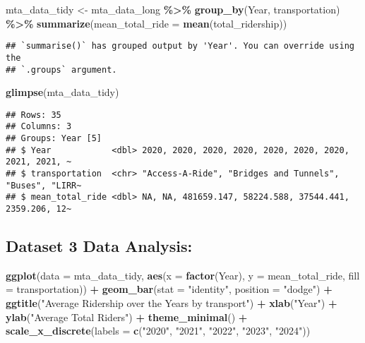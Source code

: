 \documentclass[
]{article}
\newenvironment{Shaded}{\begin{snugshade}}{\end{snugshade}}
\newcommand{\AttributeTok}[1]{\textcolor[rgb]{0.13,0.29,0.53}{#1}}
\newcommand{\FunctionTok}[1]{\textcolor[rgb]{0.13,0.29,0.53}{\textbf{#1}}}
\newcommand{\NormalTok}[1]{#1}
\newcommand{\OtherTok}[1]{\textcolor[rgb]{0.56,0.35,0.01}{#1}}
\newcommand{\SpecialCharTok}[1]{\textcolor[rgb]{0.81,0.36,0.00}{\textbf{#1}}}
\newcommand{\StringTok}[1]{\textcolor[rgb]{0.31,0.60,0.02}{#1}}
\begin{document}
\begin{Shaded}
\begin{Highlighting}[]
\NormalTok{mta\_data\_tidy }\OtherTok{\textless{}{-}}\NormalTok{ mta\_data\_long }\SpecialCharTok{\%\textgreater{}\%}
  \FunctionTok{group\_by}\NormalTok{(Year, transportation) }\SpecialCharTok{\%\textgreater{}\%}
  \FunctionTok{summarize}\NormalTok{(}\AttributeTok{mean\_total\_ride =} \FunctionTok{mean}\NormalTok{(total\_ridership))}
\end{Highlighting}
\end{Shaded}

\begin{verbatim}
## `summarise()` has grouped output by 'Year'. You can override using the
## `.groups` argument.
\end{verbatim}

\begin{Shaded}
\begin{Highlighting}[]
\FunctionTok{glimpse}\NormalTok{(mta\_data\_tidy)}
\end{Highlighting}
\end{Shaded}

\begin{verbatim}
## Rows: 35
## Columns: 3
## Groups: Year [5]
## $ Year            <dbl> 2020, 2020, 2020, 2020, 2020, 2020, 2020, 2021, 2021, ~
## $ transportation  <chr> "Access-A-Ride", "Bridges and Tunnels", "Buses", "LIRR~
## $ mean_total_ride <dbl> NA, NA, 481659.147, 58224.588, 37544.441, 2359.206, 12~
\end{verbatim}

\subsection{Dataset 3 Data Analysis:}\label{dataset-3-data-analysis}

\begin{Shaded}
\begin{Highlighting}[]
\FunctionTok{ggplot}\NormalTok{(}\AttributeTok{data =}\NormalTok{ mta\_data\_tidy, }\FunctionTok{aes}\NormalTok{(}\AttributeTok{x =} \FunctionTok{factor}\NormalTok{(Year), }\AttributeTok{y =}\NormalTok{ mean\_total\_ride, }\AttributeTok{fill =}\NormalTok{ transportation)) }\SpecialCharTok{+}
  \FunctionTok{geom\_bar}\NormalTok{(}\AttributeTok{stat =} \StringTok{"identity"}\NormalTok{, }\AttributeTok{position =} \StringTok{"dodge"}\NormalTok{) }\SpecialCharTok{+}
  \FunctionTok{ggtitle}\NormalTok{(}\StringTok{"Average Ridership over the Years by transport"}\NormalTok{) }\SpecialCharTok{+}
  \FunctionTok{xlab}\NormalTok{(}\StringTok{"Year"}\NormalTok{) }\SpecialCharTok{+}
  \FunctionTok{ylab}\NormalTok{(}\StringTok{"Average Total Riders"}\NormalTok{) }\SpecialCharTok{+}
  \FunctionTok{theme\_minimal}\NormalTok{() }\SpecialCharTok{+}
  \FunctionTok{scale\_x\_discrete}\NormalTok{(}\AttributeTok{labels =} \FunctionTok{c}\NormalTok{(}\StringTok{"2020"}\NormalTok{, }\StringTok{"2021"}\NormalTok{, }\StringTok{"2022"}\NormalTok{, }\StringTok{"2023"}\NormalTok{, }\StringTok{"2024"}\NormalTok{))}
\end{Highlighting}
\end{Shaded}
\end{document}
